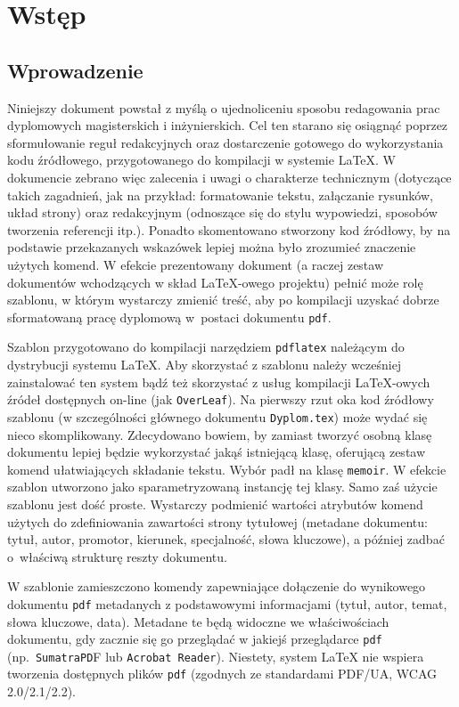 \chapter{Wstęp}
\section{Wprowadzenie}
Niniejszy dokument powstał z myślą o ujednoliceniu sposobu redagowania prac dyplomowych magisterskich i inżynierskich. Cel ten starano się osiągnąć poprzez sformułowanie reguł redakcyjnych oraz dostarczenie gotowego do wykorzystania kodu źródłowego, przygotowanego do kompilacji w systemie \LaTeX{}. W dokumencie zebrano więc zalecenia i uwagi o charakterze technicznym (dotyczące takich zagadnień, jak na przykład: formatowanie tekstu, załączanie rysunków, układ strony) oraz redakcyjnym (odnoszące się do stylu wypowiedzi, sposobów tworzenia referencji itp.). Ponadto skomentowano stworzony kod źródłowy, by na podstawie przekazanych wskazówek lepiej można było zrozumieć znaczenie użytych komend. W efekcie prezentowany dokument (a raczej zestaw dokumentów wchodzących w skład \LaTeX{}-owego projektu) pełnić może rolę szablonu, w którym wystarczy zmienić treść, aby po kompilacji uzyskać dobrze sformatowaną pracę dyplomową w~postaci dokumentu \texttt{pdf}.  



Szablon przygotowano do kompilacji narzędziem \texttt{pdflatex} należącym do dystrybucji systemu \LaTeX. Aby skorzystać z szablonu należy wcześniej zainstalować ten system  bądź też skorzystać z usług kompilacji \LaTeX-owych źródeł dostępnych on-line (jak \texttt{OverLeaf}). Na pierwszy rzut oka kod źródłowy szablonu (w szczególności głównego dokumentu \texttt{Dyplom.tex}) może wydać się nieco skomplikowany. Zdecydowano bowiem, by zamiast tworzyć osobną klasę dokumentu lepiej będzie wykorzystać jakąś istniejącą klasę, oferującą zestaw komend ułatwiających składanie tekstu. Wybór padł na klasę \texttt{memoir}. W efekcie szablon utworzono jako sparametryzowaną instancję tej klasy. 
Samo zaś użycie szablonu jest dość proste. Wystarczy podmienić wartości atrybutów komend użytych do zdefiniowania zawartości strony tytułowej (metadane dokumentu: tytuł, autor, promotor, kierunek, specjalność, słowa kluczowe), a później zadbać o~właściwą strukturę reszty dokumentu. 

W szablonie zamieszczono komendy zapewniające dołączenie  do wynikowego dokumentu \texttt{pdf} metadanych z podstawowymi informacjami (tytuł, autor, temat, słowa kluczowe, data). Metadane te będą widoczne we właściwościach dokumentu, gdy zacznie się go przeglądać w jakiejś przeglądarce \texttt{pdf} (np.~\texttt{SumatraPD}F lub \texttt{Acrobat Reader}). Niestety, system \LaTeX{} nie wspiera tworzenia dostępnych plików \texttt{pdf} (zgodnych ze standardami PDF/UA, WCAG 2.0/2.1/2.2).

